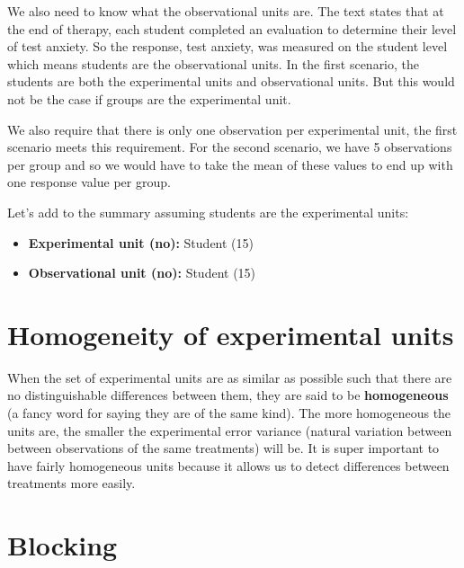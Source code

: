 \documentclass[
  letterpaper,
]{book}
\providecommand{\tightlist}{%
  \setlength{\itemsep}{0pt}\setlength{\parskip}{0pt}}\usepackage{longtable,booktabs,array}
\begin{document}
We also need to know what the observational units are. The text states
that at the end of therapy, each student completed an evaluation to
determine their level of test anxiety. So the response, test anxiety,
was measured on the student level which means students are the
observational units. In the first scenario, the students are both the
experimental units and observational units. But this would not be the
case if groups are the experimental unit.

We also require that there is only one observation per experimental
unit, the first scenario meets this requirement. For the second
scenario, we have 5 observations per group and so we would have to take
the mean of these values to end up with one response value per group.

Let's add to the summary assuming students are the experimental units:

\begin{itemize}
\tightlist
\item
  \textbf{Experimental unit (no):} Student (15)\\
\item
  \textbf{Observational unit (no):} Student (15)
\end{itemize}

\section*{\texorpdfstring{\textbf{Homogeneity of experimental
units}}{Homogeneity of experimental units}}\label{homogeneity-of-experimental-units}


When the set of experimental units are as similar as possible such that
there are no distinguishable differences between them, they are said to
be \textbf{homogeneous} (a fancy word for saying they are of the same
kind). The more homogeneous the units are, the smaller the experimental
error variance (natural variation between between observations of the
same treatments) will be. It is super important to have fairly
homogeneous units because it allows us to detect differences between
treatments more easily.

\section*{\texorpdfstring{\textbf{Blocking}}{Blocking}}\label{blocking}
\end{document}
